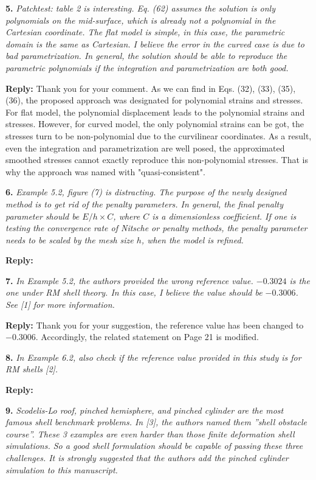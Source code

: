 \documentclass{article}
\begin{document}
\textbf{5.} \textit{Patchtest: table 2 is interesting. Eq. (62) assumes the solution is only polynomials on the mid-surface, which is already not a polynomial in the Cartesian coordinate. The flat model is simple, in this case, the parametric domain is the same as Cartesian. I believe the error in the curved case is due to bad parametrization. In general, the solution should be able to reproduce the parametric polynomials if the integration and parametrization are both good.}

\textbf{Reply:} Thank you for your comment. As we can find in Eqs. (32), (33), (35), (36),  the proposed approach was designated for polynomial strains and stresses. For flat model, the polynomial displacement leads to the polynomial strains and stresses. However, for curved model, the only polynomial strains can be got, the stresses turn to be non-polynomial due to the curvilinear coordinates. As a result, even the integration and parametrization are well posed, the approximated smoothed stresses cannot exactly reproduce this non-polynomial stresses. That is why the approach was named with "quasi-consistent".
 
\textbf{6.} \textit{Example 5.2, figure (7) is distracting. The purpose of the newly designed method is to get rid of the penalty parameters. In general, the final penalty parameter should be $E/h\times C$, where $C$ is a dimensionless coefficient. If one is testing the convergence rate of Nitsche or penalty methods, the penalty parameter needs to be scaled by the mesh size $h$, when the model is refined.}

\textbf{Reply:}

\textbf{7.} \textit{In Example 5.2, the authors provided the wrong reference value. $-0.3024$ is the one under RM shell theory. In this case, I believe the value should be $-0.3006$. See [1] for more information.}

\textbf{Reply:} Thank you for your suggestion, the reference value has been changed to $-0.3006$. Accordingly, the related statement on Page 21 is modified.

\textbf{8.} \textit{In Example 6.2, also check if the reference value provided in this study is for RM shells [2].}

\textbf{Reply:}

\textbf{9.} \textit{Scodelis-Lo roof, pinched hemisphere, and pinched cylinder are the most famous shell benchmark problems. In [3], the authors named them ”shell obstacle course”. These 3 examples are even harder than those finite deformation shell simulations. So a good shell formulation should be capable of passing these three challenges. It is strongly suggested that the authors add the pinched cylinder simulation to this manuscript.}
\end{document}
